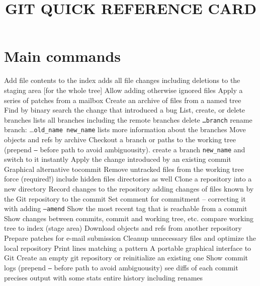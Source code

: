 
\title{GIT QUICK REFERENCE CARD}

\shortcopyrightnotice

\section{Main commands}
	{Add file contents to the index}
	{adds all file changes including deletions to the staging area [for the whole tree]}
	{Allow adding otherwise ignored files}
	{Apply a series of patches from a mailbox}
	{Create an archive of files from a named tree}
	{Find by binary search the change that introduced a bug}
	{List, create, or delete branches}
	{lists all branches including the remote branches}
	{delete {\tt \dots branch}}
	{rename branch: \dots {\tt old\_name new\_name}}
	{lists more information about the branches}
	{Move objects and refs by archive}
	{Checkout a branch or paths to the working tree (prepend {\tt --} before path to avoid ambiguousity).}
	{create a branch {\tt new\_name} and switch to it instantly}
	{Apply the change introduced by an existing commit}
	{Graphical alternative tocommit}
	{Remove untracked files from the working tree}
	{force (required!)}
	{include hidden files}
	{directories as well}
	{Clone a repository into a new directory}
	{Record changes to the repository}
	{adding changes of files known by the Git repository to the commit}
	{Set comment for commitment -- correcting it with adding {\tt --amend}}
	{Show the most recent tag that is reachable from a commit}
	{Show changes between commits, commit and working tree, etc.}
	{compare working tree to index (stage area)}
	{Download objects and refs from another repository}
	{Prepare patches for e-mail submission}
	{Cleanup unnecessary files and optimize the local repository}
	{Print lines matching a pattern}
	{A portable graphical interface to Git}
	{Create an empty git repository or reinitialize an existing one}
	{Show commit logs (prepend {\tt --} before path to avoid ambiguousity)}
	{see diffs of each commit}
	{precises output with some stats}
	{entire history including renames}
